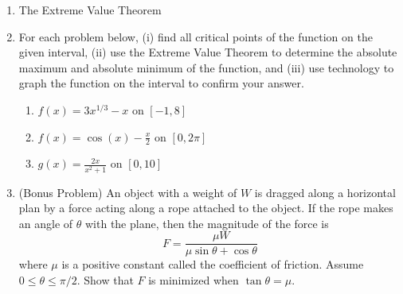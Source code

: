 \documentclass[11pt,fleqn]{article}
\begin{document}
\setlength{\parindent}{0cm}
\renewcommand{\headrulewidth}{0pt}
\newcommand{\blank}[1]{\rule{#1}{0.75pt}}
\renewcommand{\d}{\displaystyle}
\vspace*{-0.7in}
\begin{center}
 {\large{ }}
\end{center}
 \begin{enumerate}
 \item The Extreme Value Theorem
 \vspace{2in}
 \item For each problem below, (i) find all critical points of the function on the given interval, (ii) use the Extreme Value Theorem to determine the absolute maximum and absolute minimum of the function, and (iii) use technology to graph the function on the interval to confirm your answer.
 \begin{enumerate}
 \item $f(x)=3x^{1/3}-x$ on $[-1,8]$
 \newpage
 \item $f(x)=\cos(x) - \frac{x}{2}$ on $[0,2\pi]$
 \vfill
 \item $g(x)=\frac{2x}{x^2+1}$ on $[0,10]$
 \vfill
 \end{enumerate}
 \item (Bonus Problem) An object with a weight of $W$ is dragged along a horizontal plan by a force acting along a rope attached to the object. If the rope makes an angle of $\theta$ with the plane, then the magnitude of the force is
 $$F=\frac{\mu W}{\mu \sin \theta + \cos \theta}$$ where $\mu$ is a positive constant called the coefficient of friction. Assume $0 \leq \theta \leq \pi/2.$ Show that $F$ is minimized when $\tan \theta = \mu.$
 \vspace{1.5in}
 \end{enumerate}
\end{document}
